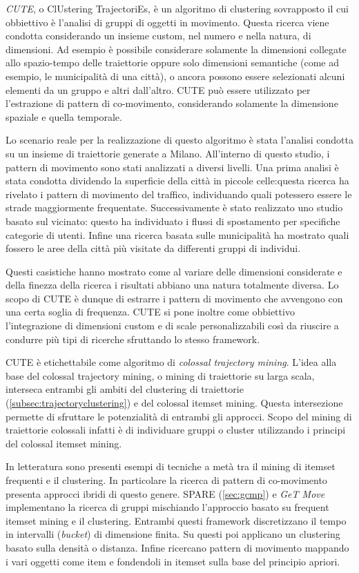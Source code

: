 \textit{CUTE}, o ClUstering TrajectoriEs, è un algoritmo di clustering sovrapposto il cui obbiettivo è l'analisi
di gruppi di oggetti in movimento. 
Questa ricerca viene condotta considerando un insieme custom, nel numero e nella natura, di dimensioni.
Ad esempio è possibile considerare solamente la dimensioni collegate allo spazio-tempo
delle traiettorie oppure solo dimensioni semantiche (come ad esempio, le municipalità di una città), o ancora possono essere selezionati alcuni elementi da un gruppo e altri dall'altro.
CUTE può essere utilizzato per l'estrazione di pattern di co-movimento, considerando solamente la dimensione spaziale e quella temporale.

Lo scenario reale per la realizzazione di questo algoritmo è stata l'analisi condotta su
un insieme di traiettorie generate a Milano. 
All'interno di questo studio, i pattern di movimento sono stati analizzati a diversi livelli.
Una prima analisi è stata condotta dividendo la superficie della città in piccole celle:questa ricerca
ha rivelato i pattern di movimento del traffico, individuando quali potessero essere le strade
maggiormente frequentate.
Successivamente è stato realizzato uno studio basato sul vicinato: questo ha individuato i flussi di spostamento per specifiche categorie di utenti.
Infine una ricerca basata sulle municipalità ha mostrato quali fossero le aree della città più visitate da differenti gruppi di individui.

Questi casistiche hanno mostrato come al variare delle dimensioni considerate e della finezza della ricerca i risultati abbiano una natura totalmente diversa.
Lo scopo di CUTE è dunque di estrarre i pattern di movimento che avvengono con una certa soglia di frequenza.
CUTE si pone inoltre come obbiettivo l'integrazione di dimensioni custom e di scale personalizzabili così da riuscire a condurre più tipi di ricerche sfruttando lo stesso framework.

CUTE è etichettabile come algoritmo di \textit{colossal trajectory mining}.
L'idea alla base del colossal trajectory mining,
o mining di traiettorie su larga scala, interseca entrambi gli ambiti del clustering di traiettorie (\cref{subsec:trajectoryclustering})
e del colossal itemset mining.
Questa intersezione permette di sfruttare le potenzialità di entrambi gli approcci.
Scopo del mining di traiettorie colossali infatti è di individuare gruppi o cluster utilizzando i principi del colossal itemset mining.

In letteratura sono presenti esempi di tecniche a metà tra il mining di itemset frequenti e il clustering.
In particolare la ricerca di pattern di co-movimento presenta approcci ibridi di questo genere.
SPARE (\cref{sec:gcmp}) e \textit{GeT Move}~\cite{DBLP:journals/ijitdm/PhanPT16} implementano la ricerca di gruppi mischiando l'approccio basato su frequent itemset mining e il clustering.
Entrambi questi framework discretizzano il tempo in intervalli (\textit{bucket}) di dimensione finita.
Su questi poi applicano un clustering basato sulla densità o distanza.
Infine ricercano pattern di movimento mappando i vari oggetti come item e fondendoli in itemset sulla base del principio apriori.

